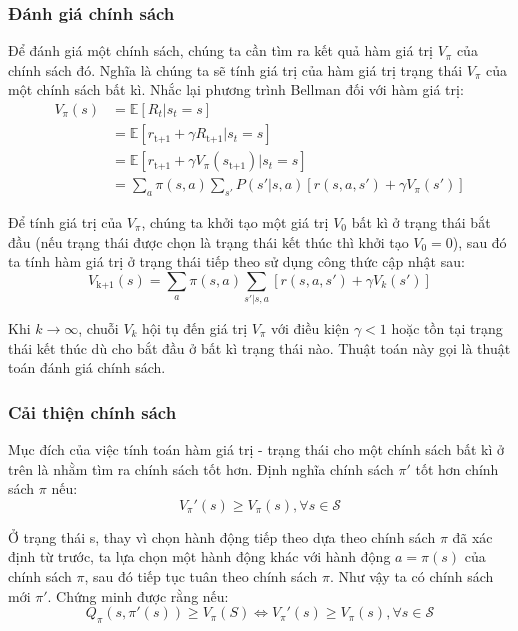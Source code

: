 \documentclass{uetgraduation}
\begin{document}
\subsubsection{Đánh giá chính sách}
Để đánh giá một chính sách, chúng ta cần tìm ra kết quả hàm giá trị $V_\pi$ của chính sách đó. Nghĩa là chúng ta sẽ tính giá trị của hàm giá trị trạng thái $V_\pi$ của một chính sách bất kì.
Nhắc lại phương trình Bellman đối với hàm giá trị:
\begin{equation}
    \begin{split}
        V_\pi (s) &= \mathbb{E} [R_t | s_t = s] \\
        &= \mathbb{E} [r_\text{t+1} + \gamma R_\text{t+1} | s_t = s] \\
        &= \mathbb{E} [r_\text{t+1} + \gamma V_\pi (s_\text{t+1}) | s_t = s] \\
        &= \sum_{a} \pi(s, a) \sum_{s'} P(s' | s, a) [r(s, a, s') + \gamma V_\pi (s')]
    \end{split}
\end{equation}

Để tính giá trị của $V_\pi$, chúng ta khởi tạo một giá trị $V_0$ bất kì ở trạng thái bắt đầu (nếu trạng thái được chọn là trạng thái kết thúc thì khởi tạo $V_0 = 0$), sau đó ta tính hàm giá trị
ở trạng thái tiếp theo sử dụng công thức cập nhật sau:
\begin{equation}
    V_\text{k+1} (s) = \sum_{a} \pi (s, a) \sum_{s' | s, a} [r(s, a, s') + \gamma V_k (s')]
\end{equation}

Khi $k \to \infty$, chuỗi $V_k$ hội tụ đến giá trị $V_\pi$ với điều kiện $\gamma < 1$ hoặc tồn tại trạng thái kết thúc dù cho bắt đầu ở bất kì trạng thái nào. Thuật toán này gọi là thuật toán đánh giá
chính sách.

\subsubsection{Cải thiện chính sách}
Mục đích của việc tính toán hàm giá trị - trạng thái cho một chính sách bất kì ở trên là nhằm tìm ra chính sách tốt hơn. Định nghĩa chính sách $\pi'$ tốt hơn chính sách $\pi$ nếu:
\begin{equation}
    V_\pi' (s) \geq V_\pi (s), \forall s \in \mathcal{S}
\end{equation}

Ở trạng thái s, thay vì chọn hành động tiếp theo dựa theo chính sách $\pi$ đã xác định từ trước, ta lựa chọn một hành động khác với hành động $a = \pi(s)$ của chính sách $\pi$, sau
đó tiếp tục tuân theo chính sách $\pi$. Như vậy ta có chính sách mới $\pi'$. Chứng minh được rằng nếu:
\begin{equation}
    Q_\pi(s, \pi'(s)) \geq V_\pi (S) \iff V_\pi' (s) \geq V_\pi (s), \forall s \in \mathcal{S}
\end{equation}
\end{document}
